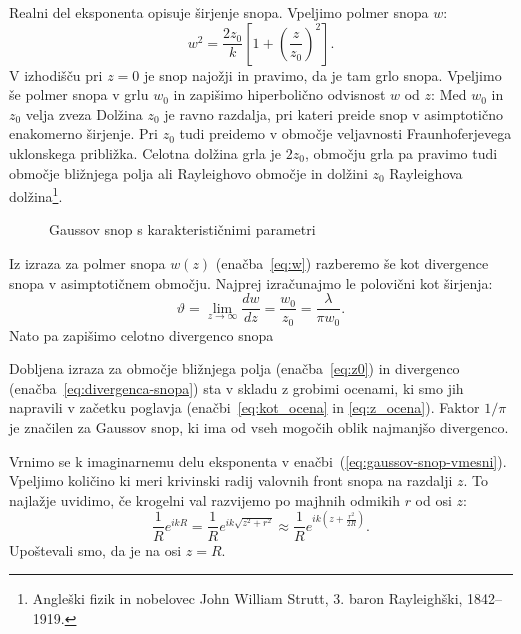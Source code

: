 Realni del eksponenta opisuje širjenje snopa. Vpeljimo polmer snopa
$w$: 
\begin{equation}
w^{2}=\frac{2z_{0}}{k}\left[1+\left(\frac{z}{z_{0}}\right)^{2}\right].
\end{equation}
V izhodišču pri $z=0$ je snop najožji in pravimo, da je tam grlo snopa. 
Vpeljimo še polmer snopa v grlu $w_0$ in zapišimo hiperbolično odvisnost $w$ od $z$:
Med $w_{0}$ in $z_{0}$ velja zveza 
Dolžina $z_{0}$ je ravno razdalja, pri kateri preide snop v asimptotično enakomerno širjenje.
Pri $z_{0}$ tudi preidemo v območje veljavnosti Fraunhoferjevega uklonskega približka. 
Celotna dolžina grla je $2z_0$, območju grla pa pravimo tudi območje bližnjega polja ali 
Rayleighovo območje in dolžini $z_0$ Rayleighova 
dolžina\footnote{Angleški fizik in nobelovec John William Strutt, 3. baron Rayleighški, 1842--1919.}.

\begin{figure}[h]
\centering
\def\svgwidth{100truemm} 

\caption{Gaussov snop s karakterističnimi parametri}
\label{fig:Gauss}
\end{figure}

Iz izraza za polmer snopa $w(z)$ (enačba~\ref{eq:w}) razberemo še kot divergence snopa v
asimptotičnem območju. Najprej izračunajmo le polovični kot širjenja:
\begin{equation}
\vartheta=\lim_{z \to \infty} \frac{dw}{dz} = \frac{w_{0}}{z_{0}}=\frac{\lambda}{\pi w_{0}}.\label{eq:divergenca-snopa}
\end{equation}
Nato pa zapišimo celotno divergenco snopa

Dobljena izraza za območje bližnjega polja (enačba~\ref{eq:z0}) in divergenco 
(enačba~\ref{eq:divergenca-snopa}) sta v skladu z grobimi ocenami, ki smo jih 
napravili v začetku poglavja (enačbi~\ref{eq:kot_ocena} in \ref{eq:z_ocena}). Faktor 
$1/\pi$ je značilen za Gaussov snop, ki ima od vseh mogočih oblik 
najmanjšo divergenco.

Vrnimo se k imaginarnemu delu eksponenta v enačbi~(\ref{eq:gaussov-snop-vmesni}).
Vpeljimo količino 
ki meri krivinski radij valovnih front 
snopa na razdalji $z$. To najlažje
uvidimo, če krogelni val razvijemo po majhnih odmikih $r$ od osi
$z$: 
\begin{equation}
\frac{1}{R}e^{ikR}=\frac{1}{R}e^{ik\sqrt{z^{2}+r^{2}}}\approx \frac{1}{R}e^{ik(z+\frac{r^{2}}{2R})}.\label{eq:krogelni-val}
\end{equation}
 Upoštevali smo, da je na osi $z=R$.

